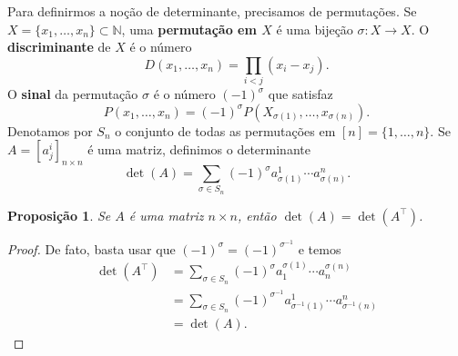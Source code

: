 \documentclass{article}
\newtheorem{proposition}[definition]{Proposição}
\begin{document}
Para definirmos a noção de determinante, precisamos de permutações. Se $X = \{x_1, \dots, x_n\} \subset \mathbb{N}$, uma \textbf{permutação em $X$} é uma bijeção $\sigma \colon X \to X$. O \textbf{discriminante} de $X$ é o número \begin{equation}
    D(x_1, \dots, x_n) = \prod_{i < j} (x_i - x_j).
\end{equation} O \textbf{sinal} da permutação $\sigma$ é o número $(-1)^\sigma$ que satisfaz \begin{equation}
    P(x_1, \dots, x_n) = (-1)^\sigma P(X_{\sigma(1)}, \dots, x_{\sigma(n)}).
\end{equation} Denotamos por $S_n$ o conjunto de todas as permutações em $[n] = \{1, \dots, n\}$. Se $A = [a^i_j]_{n \times n}$ é uma matriz, definimos o determinante \begin{equation}
    \det(A) = \sum_{\sigma \in S_n} (-1)^\sigma a^1_{\sigma(1)} \cdots a^n_{\sigma(n)}.
\end{equation}

\begin{proposition}\label{prop31}
    Se $A$ é uma matriz $n \times n$, então $\det(A) = \det(A^\top)$.
\end{proposition}
\begin{proof}
    De fato, basta usar que $(-1)^\sigma = (-1)^{\sigma^{-1}}$ e temos \begin{align}
        \det(A^\top) &= \sum_{\sigma \in S_n} (-1)^\sigma a^{\sigma(1)}_1 \cdots a^{\sigma(n)}_n \\ &= \sum_{\sigma \in S_n} (-1)^{\sigma^{-1}} a^1_{\sigma^{-1}(1)} \cdots a^n_{\sigma^{-1}(n)} \\ &= \det(A).
    \end{align}
\end{proof}
\end{document}

